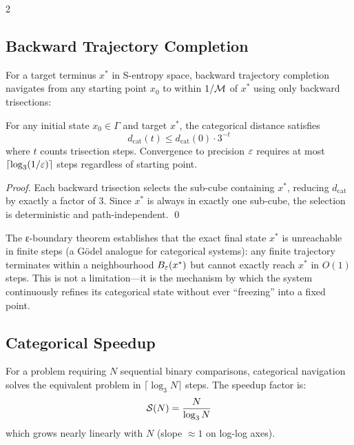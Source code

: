 \begin{multicols}{2}
\subsection{Backward Trajectory Completion}

For a target terminus $x^*$ in S-entropy space, backward trajectory completion navigates from any starting point $x_0$ to within $1/\mathcal{M}$ of $x^*$ using only backward trisections:

\begin{theorem}
\label{thm:convergence}
For any initial state $x_0 \in \Gamma$ and target $x^*$, the categorical distance satisfies
\begin{equation}
d_{\mathrm{cat}}(t) \leq d_{\mathrm{cat}}(0)\cdot 3^{-t}
\label{eq:ch11_convergence}
\end{equation}
where $t$ counts trisection steps. Convergence to precision $\varepsilon$ requires at most $\lceil\log_3(1/\varepsilon)\rceil$ steps regardless of starting point.
\end{theorem}

\begin{proof}
Each backward trisection selects the sub-cube containing $x^*$, reducing $d_{\mathrm{cat}}$ by exactly a factor of $3$. Since $x^*$ is always in exactly one sub-cube, the selection is deterministic and path-independent. \qed
\end{proof}

The ε-boundary theorem establishes that the exact final state $x^*$ is unreachable in finite steps (a Gödel analogue for categorical systems): any finite trajectory terminates within a neighbourhood $B_\varepsilon(x^*)$ but cannot exactly reach $x^*$ in $O(1)$ steps. This is not a limitation---it is the mechanism by which the system continuously refines its categorical state without ever ``freezing'' into a fixed point.

\subsection{Categorical Speedup}

\begin{theorem}
\label{thm:speedup}
For a problem requiring $N$ sequential binary comparisons, categorical navigation solves the equivalent problem in $\lceil\log_3 N\rceil$ steps. The speedup factor is:
\begin{equation}
\mathcal{S}(N) = \frac{N}{\log_3 N}
\label{eq:ch11_speedup}
\end{equation}
which grows nearly linearly with $N$ (slope $\approx 1$ on log-log axes).
\end{theorem}


\end{multicols}
